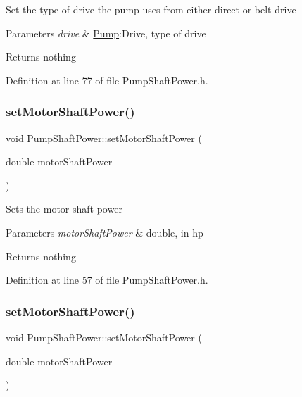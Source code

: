 Set the type of drive the pump uses from either direct or belt drive


\begin{DoxyParams}{Parameters}
{\em drive} & \hyperlink{class_pump}{Pump}\+:Drive, type of drive\\
\hline
\end{DoxyParams}
\begin{DoxyReturn}{Returns}
nothing 
\end{DoxyReturn}


Definition at line 77 of file Pump\+Shaft\+Power.\+h.

\mbox{\label{class_pump_shaft_power_a77b8c621c7c92841dbd00112437c413b}} 
\subsubsection{\texorpdfstring{set\+Motor\+Shaft\+Power()}{setMotorShaftPower()}\hspace{0.1cm}{\footnotesize\ttfamily [1/3]}}
{\footnotesize\ttfamily void Pump\+Shaft\+Power\+::set\+Motor\+Shaft\+Power (\begin{DoxyParamCaption}\item[{double}]{motor\+Shaft\+Power }\end{DoxyParamCaption})\hspace{0.3cm}{\ttfamily [inline]}}

Sets the motor shaft power


\begin{DoxyParams}{Parameters}
{\em motor\+Shaft\+Power} & double, in hp\\
\hline
\end{DoxyParams}
\begin{DoxyReturn}{Returns}
nothing 
\end{DoxyReturn}


Definition at line 57 of file Pump\+Shaft\+Power.\+h.

\mbox{\label{class_pump_shaft_power_a77b8c621c7c92841dbd00112437c413b}} 
\subsubsection{\texorpdfstring{set\+Motor\+Shaft\+Power()}{setMotorShaftPower()}\hspace{0.1cm}{\footnotesize\ttfamily [2/3]}}
{\footnotesize\ttfamily void Pump\+Shaft\+Power\+::set\+Motor\+Shaft\+Power (\begin{DoxyParamCaption}\item[{double}]{motor\+Shaft\+Power }\end{DoxyParamCaption})\hspace{0.3cm}{\ttfamily [inline]}}

